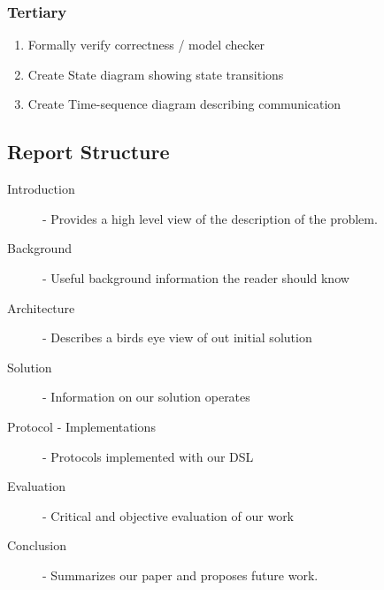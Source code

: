 \subsubsection{Tertiary}
\begin{enumerate}
    \item Formally verify correctness / model checker
    \item Create State diagram showing state transitions
    \item Create Time-sequence diagram describing communication
\end{enumerate}


\subsection{Report Structure}
\begin{description}
  \item[Introduction] - Provides a high level view of the description of the problem.
  \item[Background] - Useful background information the reader should know
  \item[Architecture] - Describes a birds eye view of out initial solution
  \item[Solution] - Information on our solution operates 
  \item[Protocol - Implementations] - Protocols implemented with our DSL
  \item[Evaluation] - Critical and objective evaluation of our work 
  \item[Conclusion] - Summarizes our paper and proposes future work.
\end{description}









